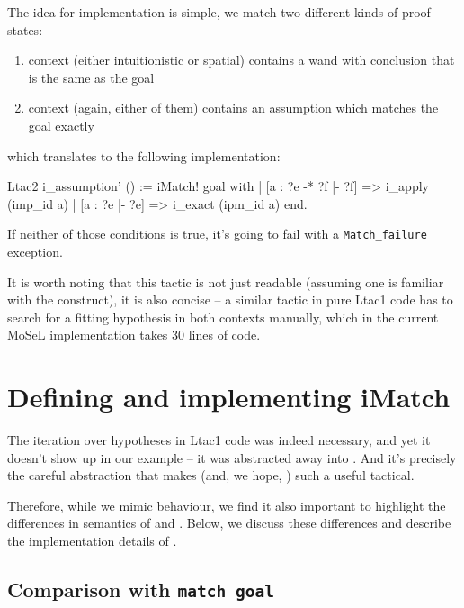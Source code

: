 The idea for implementation is simple, we match two different kinds of proof states:
\begin{enumerate}
\item context (either intuitionistic or spatial) contains a wand with conclusion that is the same as the goal
\item context (again, either of them) contains an assumption which matches the goal exactly
\end{enumerate}

which translates to the following implementation:

\begin{minipage}{\linewidth}
\begin{coq}
Ltac2 i_assumption' () :=
  iMatch! goal with
  | [a : ?e -* ?f |- ?f] => i_apply (imp_id a)
  | [a : ?e |- ?e] => i_exact (ipm_id a)
  end.
\end{coq}
\end{minipage}

If neither of those conditions is true, it's going to fail with a {\color{red} \texttt{Match\_failure}} exception.

It is worth noting that this tactic is not just readable (assuming one is familiar with the  construct), it is also concise -- a similar tactic in pure Ltac1 code has to search for a fitting hypothesis in both contexts manually, which in the current MoSeL implementation takes 30 lines of code.

\section{Defining and implementing iMatch}
\label{sec:defin-impl-imatch}

The iteration over hypotheses in Ltac1 code was indeed necessary, and yet it doesn't show up in our example -- it was abstracted away into .
And it's precisely the careful abstraction that makes  (and, we hope, ) such a useful tactical.

Therefore, while we mimic  behaviour, we find it also important to highlight the differences in semantics of  and .
Below, we discuss these differences and describe the implementation details of .

\subsection{Comparison with \texttt{match goal}}

